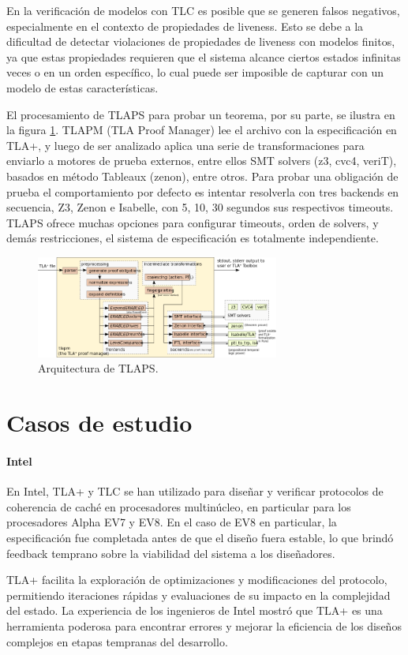 \documentclass[runningheads]{llncs}
\begin{document}
En la verificación de modelos con TLC es posible que se generen falsos negativos, especialmente en el contexto de propiedades de liveness. Esto se debe a la dificultad de detectar violaciones de propiedades de liveness con modelos finitos, ya que estas propiedades requieren que el sistema alcance ciertos estados infinitas veces o en un orden específico, lo cual puede ser imposible de capturar con un modelo de estas características.

El procesamiento de TLAPS para probar un teorema, por su parte, se ilustra en la figura \ref{fig1}. TLAPM (TLA Proof Manager) lee el archivo con la especificación en TLA+, y luego de ser analizado aplica una serie de transformaciones para enviarlo a motores de prueba externos, entre ellos SMT solvers (z3, cvc4, veriT), basados en método Tableaux (zenon), entre otros. 
Para probar una obligación de prueba el comportamiento por defecto es intentar resolverla con tres backends en secuencia, Z3, Zenon e Isabelle, con 5, 10, 30 segundos sus respectivos timeouts.
TLAPS ofrece muchas opciones para configurar timeouts, orden de solvers, y demás restricciones, el sistema de especificación es totalmente independiente.
%
\begin{figure}
    \caption{Arquitectura de TLAPS.}\label{fig1}
    \includegraphics[width=8cm]{tlaps_arch.png}
    \centering
\end{figure}
%
\section{Casos de estudio}
\paragraph{Intel}
En Intel, TLA+ y TLC se han utilizado para diseñar y verificar protocolos de coherencia de caché en procesadores multinúcleo, en particular para los procesadores Alpha EV7 y EV8. En el caso de EV8 en particular, la especificación fue completada antes de que el diseño fuera estable, lo que brindó feedback temprano sobre la viabilidad del sistema a los diseñadores.

TLA+ facilita la exploración de optimizaciones y modificaciones del protocolo, permitiendo iteraciones rápidas y evaluaciones de su impacto en la complejidad del estado. La experiencia de los ingenieros de Intel mostró que TLA+ es una herramienta poderosa para encontrar errores y mejorar la eficiencia de los diseños complejos en etapas tempranas del desarrollo.
\end{document}
